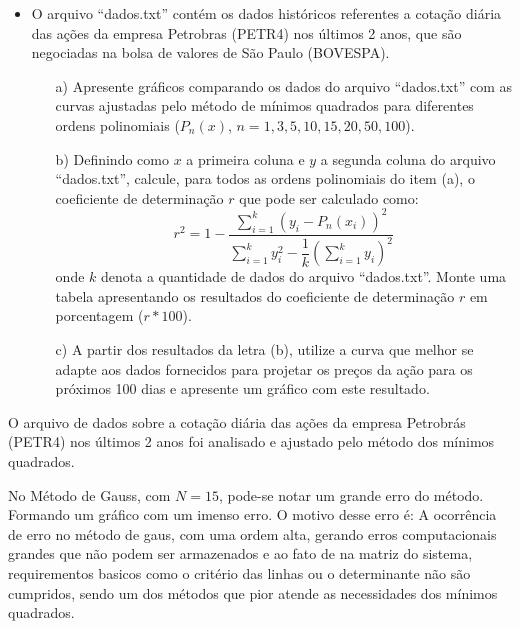 \documentclass{article}
\newcounter{execs}
\newcommand{\exec}[0]{\addtocounter{execs}{1}\item[\textbf{\arabic{execs}.}]}
\begin{document}
\thispagestyle{first}
%    

\begin{itemize}

\exec O arquivo ``dados.txt'' contém os dados históricos referentes a cotação diária das ações da empresa Petrobras (PETR4) nos últimos 2 anos, que são negociadas na bolsa de valores de São Paulo (BOVESPA). 

\begin{itemize}

\item[a)] Apresente gráficos comparando os dados do arquivo ``dados.txt'' com as curvas ajustadas pelo método de mínimos quadrados para diferentes ordens polinomiais ($P_n(x)$, $n=1,3,5,10,15,20,50,100$).

\item[b)] Definindo como $x$ a primeira coluna e $y$ a segunda coluna do arquivo ``dados.txt'', calcule, para todos as ordens polinomiais do item (a), o coeficiente de determinação $r$ que pode ser calculado como:
$$
r^2= 1 - \dfrac{\displaystyle \sum_{i=1}^{k} \left(y_i-P_n(x_i) \right)^2}{\displaystyle \sum_{i=1}^{k} y_i^2 - \dfrac{1}{k} \left(\sum_{i=1}^{k} y_i \right)^2 }
$$
onde $k$ denota a quantidade de dados do arquivo ``dados.txt''. Monte uma tabela apresentando os resultados do coeficiente de determinação $r$ em porcentagem ($r*100$).

\item[c)] A partir dos resultados da letra (b), utilize a curva que melhor se adapte aos dados fornecidos para projetar os preços da ação para os próximos 100 dias e apresente um gráfico com este resultado. 

\end{itemize}

\end{itemize}

\newpage

O arquivo de dados sobre a cotação diária das ações da empresa Petrobrás (PETR4) nos últimos 2 anos foi analisado e ajustado pelo método dos mínimos quadrados.

\text No Método de Gauss, com $N = 15$, pode-se notar um grande erro do método. Formando um gráfico com um imenso erro.  O motivo desse erro é: A ocorrência de erro no método de gaus, com uma ordem alta, gerando erros computacionais grandes que não podem ser armazenados e ao fato de na matriz do sistema, requirementos basicos como o critério das linhas ou o determinante não são cumpridos, sendo um dos métodos que pior atende as necessidades dos mínimos quadrados.
\end{document}
